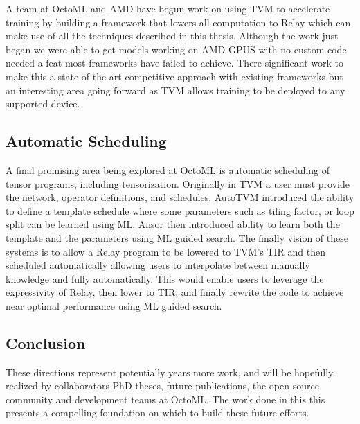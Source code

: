 A team at OctoML and AMD have begun work on using TVM
    to accelerate training by building a framework
    that lowers all computation to Relay which
    can make use of all the techniques described
    in this thesis.
Although the work just began we were able to
    get models working on AMD GPUS with no custom
    code needed a feat most frameworks have
    failed to achieve.
There significant work to make this a state
    of the art competitive approach with existing
    frameworks but an interesting area going forward
    as TVM allows training to be deployed to any
    supported device.

\subsection{Automatic Scheduling}

A final promising area being explored at OctoML is
    automatic scheduling of tensor programs, including
    tensorization.
Originally in TVM a user must provide the network,
    operator definitions, and schedules.
AutoTVM introduced the ability to define a template
    schedule where some parameters such as tiling
    factor, or loop split can be learned using ML.
Ansor then introduced ability to learn both the
    template and the parameters using ML guided
    search.
The finally vision of these systems is to allow
    a Relay program to be lowered to TVM's TIR
    and then scheduled automatically allowing
    users to interpolate between manually
    knowledge and fully automatically.
This would enable users to leverage the
    expressivity of Relay, then lower to TIR,
    and finally rewrite the code to achieve
    near optimal performance using ML guided
    search.


\subsection{Conclusion}
These directions represent potentially years more work, and will be hopefully
    realized by collaborators PhD theses, future publications, the open source
    community and development teams at OctoML.
The work done in this this presents a compelling foundation on which to build
    these future efforts.
